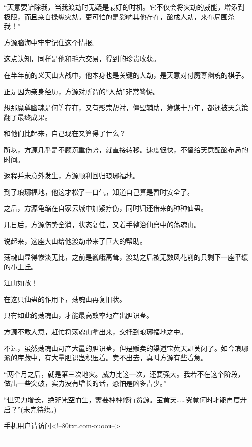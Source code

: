 \begin{this_body}
“天意要铲除我，当我渡劫时无疑是最好的时机。它不仅会将灾劫的威能，增添到极限，而且亲自操纵灾劫。更可怕的是影响其他存在，酿成人劫，来布局围杀我！”

方源脑海中牢牢记住这个情报。

这点认知，同样是他和毛六交易，得到的珍贵收获。

在半年前的义天山大战中，他本身也是关键的人劫，是天意对付魔尊幽魂的棋子。

正是因为亲身经历，方源对所谓的“人劫”非常警惕。

想那魔尊幽魂是何等存在，又有影宗帮衬，僵盟辅助，筹谋十万年，都还被天意策翻了最终成果。

和他们比起来，自己现在又算得了什么？

所以，方源几乎是不顾沉重伤势，就直接转移。速度很快，不留给天意酝酿布局的时间。

返程并未意外发生，方源顺利回归琅琊福地。

到了琅琊福地，他这才松了一口气，知道自己算是暂时安全了。

之后，方源龟缩在自家云城中加紧疗伤，同时归还借来的种种仙蛊。

几日后，方源伤势全消，状态复佳，又着手整治仙窍中的荡魂山。

说起来，这座大山给他渡劫带来了巨大的帮助。

荡魂山显得惨淡无比，之前是巍峨高耸，渡劫之后被无数风花削的只剩下一座平缓的小土丘。

江山如故！

在这只仙蛊的作用下，荡魂山再复旧状。

只有如此的荡魂山，才能最高效率地产出胆识蛊。

方源不敢大意，赶忙将荡魂山拿出来，交托到琅琊福地之中。

不过，虽然荡魂山可产大量的胆识蛊，但是贩卖的渠道宝黄天却关闭了。如今琅琊派的库藏中，有大量胆识蛊积压着。卖不出去，真叫方源有些着急。

“两个月之后，就是第三次地灾。威力比这一次，还要强大。我若不在这个阶段，做出一些突破，实力没有增长的话，恐怕是凶多吉少。”

“但实力增长，绝非凭空而生，需要种种修行资源。宝黄天……究竟何时才能再度开启？”(未完待续。)

手机用户请访问<!--80txt.com-ouoou-->

------------

\end{this_body}

